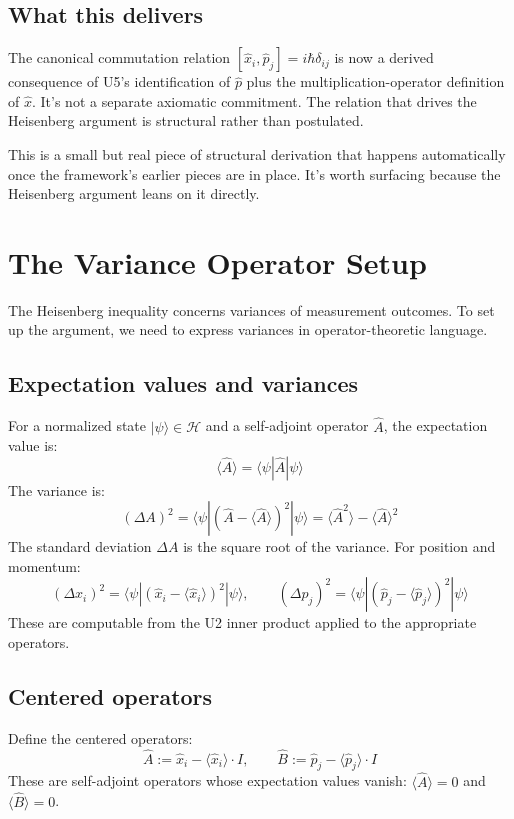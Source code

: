 \documentclass[11pt,a4paper]{article}
\begin{document}
\subsection{What this delivers}

The canonical commutation relation $[\hat{x}_i, \hat{p}_j] = i\hbar\delta_{ij}$ is now a derived consequence of U5's identification of $\hat{p}$ plus the multiplication-operator definition of $\hat{x}$. It's not a separate axiomatic commitment. The relation that drives the Heisenberg argument is structural rather than postulated.

This is a small but real piece of structural derivation that happens automatically once the framework's earlier pieces are in place. It's worth surfacing because the Heisenberg argument leans on it directly.

\section{The Variance Operator Setup}

The Heisenberg inequality concerns variances of measurement outcomes. To set up the argument, we need to express variances in operator-theoretic language.

\subsection{Expectation values and variances}

For a normalized state $|\psi\rangle \in \mathcal{H}$ and a self-adjoint operator $\hat{A}$, the expectation value is:
\[
\langle\hat{A}\rangle = \langle\psi|\hat{A}|\psi\rangle
\]
The variance is:
\[
(\Delta A)^{2} = \langle\psi|(\hat{A} - \langle\hat{A}\rangle)^{2}|\psi\rangle = \langle\hat{A}^{2}\rangle - \langle\hat{A}\rangle^{2}
\]
The standard deviation $\Delta A$ is the square root of the variance. For position and momentum:
\[
(\Delta x_i)^{2} = \langle\psi|(\hat{x}_i - \langle\hat{x}_i\rangle)^{2}|\psi\rangle, \qquad (\Delta p_j)^{2} = \langle\psi|(\hat{p}_j - \langle\hat{p}_j\rangle)^{2}|\psi\rangle
\]
These are computable from the U2 inner product applied to the appropriate operators.

\subsection{Centered operators}

Define the centered operators:
\[
\hat{A} := \hat{x}_i - \langle\hat{x}_i\rangle\cdot I, \qquad \hat{B} := \hat{p}_j - \langle\hat{p}_j\rangle\cdot I
\]
These are self-adjoint operators whose expectation values vanish: $\langle\hat{A}\rangle = 0$ and $\langle\hat{B}\rangle = 0$.
\end{document}
